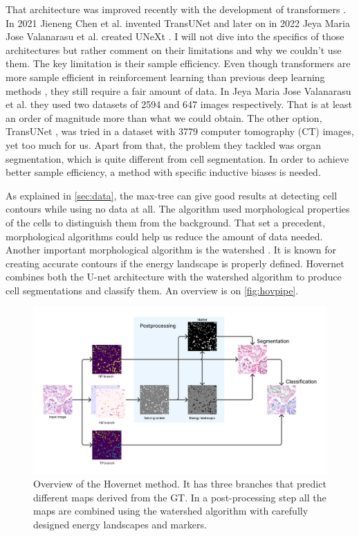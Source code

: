 That architecture was improved recently with the development of transformers \cite{transformer}. In 2021 Jieneng Chen et al. invented TransUNet \cite{transunet} and later on in 2022 Jeya Maria Jose Valanarasu et al. created UNeXt \cite{unext}. I will not dive into the specifics of those architectures but rather comment on their limitations and why we couldn't use them. The key limitation is their sample efficiency. Even though transformers are more sample efficient in reinforcement learning than previous deep learning methods \cite{micheli2023transformers}, they still require a fair amount of data. In Jeya Maria Jose Valanarasu et al. \cite{unext} they used two datasets of 2594 and 647 images respectively. That is at least an order of magnitude more than what we could obtain. The other option, TransUNet \cite{transunet}, was tried in a dataset with 3779 computer tomography (CT) images, yet too much for us. Apart from that, the problem they tackled was organ segmentation, which is quite different from cell segmentation. In order to achieve better sample efficiency, a method with specific inductive biases is needed.

As explained in \autoref{sec:data}, the max-tree \cite{maxtree} can give good results at detecting cell contours while using no data at all. The algorithm used morphological properties of the cells to distinguish them from the background. That set a precedent, morphological algorithms could help us reduce the amount of data needed. Another important morphological algorithm is the watershed \cite{watershed}. It is known for creating accurate contours if the energy landscape is properly defined. Hovernet \cite{hovernet} combines both the U-net architecture with the watershed algorithm to produce cell segmentations and classify them. An overview is on \autoref{fig:hovpipe}.

\begin{figure}[ht]
    \centering
    \includegraphics[width=\textwidth]{imgs/hovpipe.png}
    \caption{Overview of the Hovernet method. It has three branches that predict different maps derived from the GT. In a post-processing step all the maps are combined using the watershed algorithm with carefully designed energy landscapes and markers.}
    \label{fig:hovpipe}
\end{figure}

